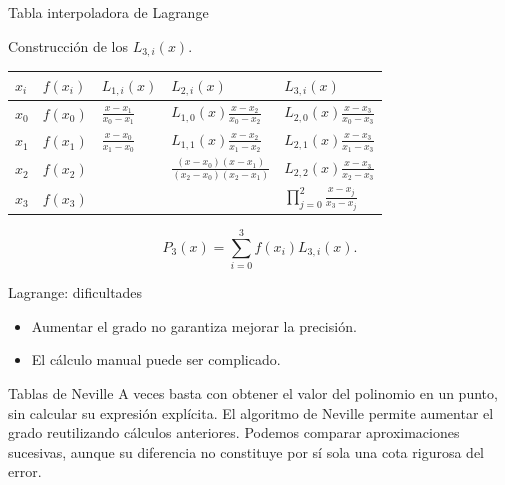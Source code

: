 \documentclass[main.tex]{subfiles}
\begin{document}
\begin{frame}[t]{Tabla interpoladora de Lagrange}
\par\noindent\begin{minipage}[t][12mm][t]{\textwidth}\small\strut Construcción de los $L_{3,i}(x)$.\end{minipage}\par\nointerlineskip
\begin{minipage}[t]{\textwidth}\begingroup\scriptsize\setlength{\tabcolsep}{3pt}\begin{center}\begin{tabular}{|C{.065\textwidth}|C{.095\textwidth}|C{.19\textwidth}|C{.25\textwidth}|C{.25\textwidth}|}\hline
\rule[-2mm]{0pt}{6mm}$x_i$&$f(x_i)$&$L_{1,i}(x)$&$L_{2,i}(x)$&$L_{3,i}(x)$\\\hline
\rule[-2.5mm]{0pt}{9mm}$x_0$&$f(x_0)$&$\frac{x-x_1}{x_0-x_1}$&$L_{1,0}(x)\frac{x-x_2}{x_0-x_2}$&$L_{2,0}(x)\frac{x-x_3}{x_0-x_3}$\\\hline
\rule[-2.5mm]{0pt}{9mm}$x_1$&$f(x_1)$&$\frac{x-x_0}{x_1-x_0}$&$L_{1,1}(x)\frac{x-x_2}{x_1-x_2}$&$L_{2,1}(x)\frac{x-x_3}{x_1-x_3}$\\\hline
\rule[-2.5mm]{0pt}{9mm}$x_2$&$f(x_2)$&&$\frac{(x-x_0)(x-x_1)}{(x_2-x_0)(x_2-x_1)}$&$L_{2,2}(x)\frac{x-x_3}{x_2-x_3}$\\\hline
\rule[-2.5mm]{0pt}{9mm}$x_3$&$f(x_3)$&&&$\prod_{j=0}^2\frac{x-x_j}{x_3-x_j}$\\\hline
\end{tabular}\end{center}\endgroup\par
\end{minipage}\par\[P_3(x)=\sum_{i=0}^3f(x_i)L_{3,i}(x).\]
\end{frame}
\begin{frame}[t]{Lagrange: dificultades}
\begin{itemize}
\item Aumentar el grado no garantiza mejorar la precisión.
\item El cálculo manual puede ser complicado.
\end{itemize}
\end{frame}
\begin{frame}[t]{Tablas de Neville}
A veces basta con obtener el valor del polinomio en un punto, sin calcular su expresión explícita.
\bigskip
El algoritmo de Neville permite aumentar el grado reutilizando cálculos anteriores.
\bigskip
Podemos comparar aproximaciones sucesivas, aunque su diferencia no constituye por sí sola una cota rigurosa del error.
\end{frame}
\end{document}
